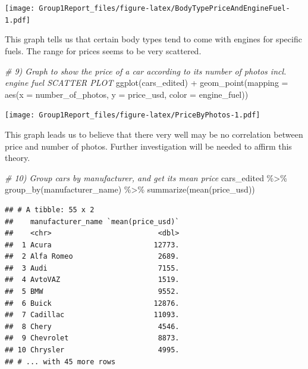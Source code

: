 \documentclass[
]{article}
\newenvironment{Shaded}{\begin{snugshade}}{\end{snugshade}}
\newcommand{\AttributeTok}[1]{\textcolor[rgb]{0.77,0.63,0.00}{#1}}
\newcommand{\CommentTok}[1]{\textcolor[rgb]{0.56,0.35,0.01}{\textit{#1}}}
\newcommand{\FunctionTok}[1]{\textcolor[rgb]{0.00,0.00,0.00}{#1}}
\newcommand{\NormalTok}[1]{#1}
\newcommand{\SpecialCharTok}[1]{\textcolor[rgb]{0.00,0.00,0.00}{#1}}
\begin{document}
\texttt{[image: Group1Report\_files/figure-latex/BodyTypePriceAndEngineFuel-1.pdf]}

This graph tells us that certain body types tend to come with engines
for specific fuels. The range for prices seems to be very scattered.

\begin{Shaded}
\begin{Highlighting}[]
\CommentTok{\# 9) Graph to show the price of a car according to its number of photos incl. engine fuel SCATTER PLOT}
\FunctionTok{ggplot}\NormalTok{(cars\_edited) }\SpecialCharTok{+} \FunctionTok{geom\_point}\NormalTok{(}\AttributeTok{mapping =} \FunctionTok{aes}\NormalTok{(}\AttributeTok{x =}\NormalTok{ number\_of\_photos, }\AttributeTok{y =}\NormalTok{ price\_usd, }\AttributeTok{color =}\NormalTok{ engine\_fuel))}
\end{Highlighting}
\end{Shaded}

\texttt{[image: Group1Report\_files/figure-latex/PriceByPhotos-1.pdf]}

This graph leads us to believe that there very well may be no
correlation between price and number of photos. Further investigation
will be needed to affirm this theory.

\begin{Shaded}
\begin{Highlighting}[]
\CommentTok{\# 10) Group cars by manufacturer, and get its mean price}
\NormalTok{cars\_edited }\SpecialCharTok{\%\textgreater{}\%} \FunctionTok{group\_by}\NormalTok{(manufacturer\_name) }\SpecialCharTok{\%\textgreater{}\%} \FunctionTok{summarize}\NormalTok{(}\FunctionTok{mean}\NormalTok{(price\_usd))}
\end{Highlighting}
\end{Shaded}

\begin{verbatim}
## # A tibble: 55 x 2
##    manufacturer_name `mean(price_usd)`
##    <chr>                         <dbl>
##  1 Acura                        12773.
##  2 Alfa Romeo                    2689.
##  3 Audi                          7155.
##  4 AvtoVAZ                       1519.
##  5 BMW                           9552.
##  6 Buick                        12876.
##  7 Cadillac                     11093.
##  8 Chery                         4546.
##  9 Chevrolet                     8873.
## 10 Chrysler                      4995.
## # ... with 45 more rows
\end{verbatim}
\end{document}
